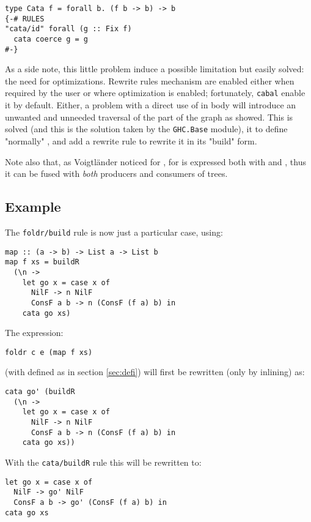 \begin{verbatim}
type Cata f = forall b. (f b -> b) -> b
{-# RULES
"cata/id" forall (g :: Fix f)
  cata coerce g = g
#-}
\end{verbatim}

As a side note, this little problem induce a possible limitation but easily solved: the need for optimizations. Rewrite rules mechanism are enabled either when required by the user or where optimization is enabled; fortunately, \verb|cabal| enable it by default. Either, a problem with a direct use of  in  body will introduce an unwanted and unneeded traversal of the part of the graph as showed. This is solved (and this is the solution taken by the \verb|GHC.Base| module), it to define "normally" , and add a rewrite rule to rewrite it in its "build" form.

Note also that, as Voigtländer \cite{Voigtlnder2008TypesFP} noticed for ,  for  is expressed both with  and , thus it can be fused with \emph{both} producers and consumers of trees.

\subsection{Example}
The \verb|foldr/build| rule is now just a particular case, using:
\begin{verbatim}
map :: (a -> b) -> List a -> List b
map f xs = buildR 
  (\n ->
    let go x = case x of
      NilF -> n NilF
      ConsF a b -> n (ConsF (f a) b) in
    cata go xs)
\end{verbatim}

The expression:
\begin{verbatim}
foldr c e (map f xs)
\end{verbatim}
(with  defined as in section \ref{sec:defi}) will first be rewritten (only by inlining) as:
\begin{verbatim}
cata go' (buildR 
  (\n ->
    let go x = case x of
      NilF -> n NilF
      ConsF a b -> n (ConsF (f a) b) in
    cata go xs))
\end{verbatim}

With the \verb|cata/buildR| rule this will be rewritten to:
\begin{verbatim}
let go x = case x of
  NilF -> go' NilF
  ConsF a b -> go' (ConsF (f a) b) in
cata go xs
\end{verbatim}

